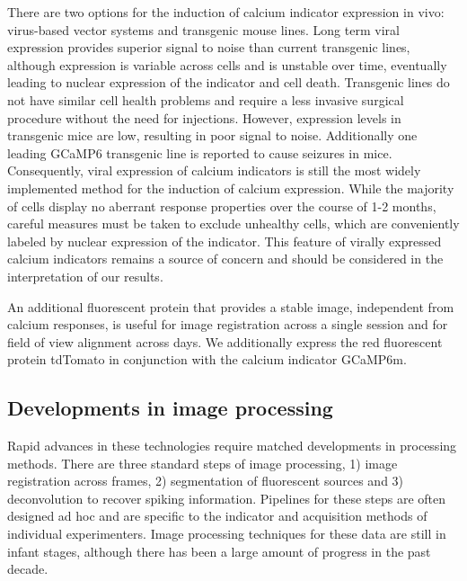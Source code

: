 There are two options for the induction of calcium indicator expression in vivo: virus-based vector systems and transgenic mouse lines. Long term viral expression provides superior signal to noise than current transgenic lines, although expression is variable across cells and is unstable over time, eventually leading to nuclear expression of the indicator and cell death. Transgenic lines do not have similar cell health problems and require a less invasive surgical procedure without the need for injections. However, expression levels in transgenic mice are low, resulting in poor signal to noise. Additionally one leading GCaMP6 transgenic line is reported to cause seizures in mice. Consequently, viral expression of calcium indicators is still the most widely implemented method for the induction of calcium expression. While the majority of cells display no aberrant response properties over the course of 1-2 months, careful measures must be taken to exclude unhealthy cells, which are conveniently labeled by nuclear expression of the indicator. This feature of virally expressed calcium indicators remains a source of concern and should be considered in the interpretation of our results.

\bigskip

An additional fluorescent protein that provides a stable image, independent from calcium responses, is useful for image registration across a single session and for field of view alignment across days. We additionally express the red fluorescent protein tdTomato in conjunction with the calcium indicator GCaMP6m.

\subsection{Developments in image processing}
Rapid advances in these technologies require matched developments in processing methods. There are three standard steps of image processing, 1) image registration across frames, 2) segmentation of fluorescent sources and 3) deconvolution to recover spiking information. Pipelines for these steps are often designed ad hoc and are specific to the indicator and acquisition methods of individual experimenters. Image processing techniques for these data are still in infant stages, although there has been a large amount of progress in the past decade. 

\bigskip

